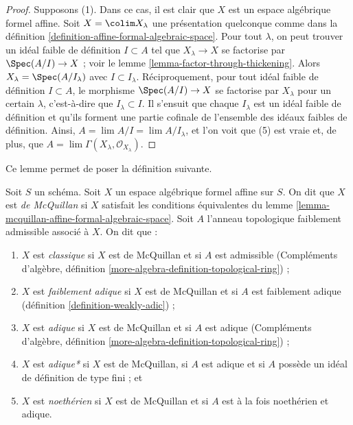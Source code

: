 \begin{proof}
\medskip\noindent
Supposons (1). Dans ce cas, il est clair que $X$ est un espace algébrique
formel affine. Soit $X = \colim X_\lambda$ une présentation quelconque comme dans
la définition \ref{definition-affine-formal-algebraic-space}.
Pour tout $\lambda$, on peut trouver un idéal faible de définition
$I \subset A$ tel que $X_\lambda \to X$ se factorise par
$\Spec(A/I) \to X$ ; voir le lemme \ref{lemma-factor-through-thickening}.
Alors $X_\lambda = \Spec(A/I_\lambda)$ avec $I \subset I_\lambda$.
Réciproquement, pour tout idéal faible de définition $I \subset A$,
le morphisme $\Spec(A/I) \to X$ se factorise par $X_\lambda$
pour un certain $\lambda$, c'est-à-dire que $I_\lambda \subset I$.
Il s'ensuit que chaque $I_\lambda$ est un idéal faible de définition
et qu'ils forment une partie cofinale de l'ensemble des idéaux faibles
de définition. Ainsi, $A = \lim A/I = \lim A/I_\lambda$,
et l'on voit que (5) est vraie et, de plus, que
$A = \lim \Gamma(X_\lambda, \mathcal{O}_{X_\lambda})$.
\end{proof}

\noindent
Ce lemme permet de poser la définition suivante.

\begin{definition}
\label{definition-types-affine-formal-algebraic-space}
Soit $S$ un schéma. Soit $X$ un espace algébrique formel affine sur $S$.
On dit que $X$ est {\it de McQuillan} si $X$ satisfait les conditions équivalentes
du lemme \ref{lemma-mcquillan-affine-formal-algebraic-space}. Soit $A$
l'anneau topologique faiblement admissible associé à $X$. On dit que :
\begin{enumerate}
\item $X$ est {\it classique} si $X$ est de McQuillan et si $A$ est admissible
(Compléments d'algèbre, définition \ref{more-algebra-definition-topological-ring}) ;
\item $X$ est {\it faiblement adique} si $X$ est de McQuillan et si $A$ est faiblement adique
(définition \ref{definition-weakly-adic}) ;
\item $X$ est {\it adique} si $X$ est de McQuillan et si $A$ est adique
(Compléments d'algèbre, définition \ref{more-algebra-definition-topological-ring}) ;
\item $X$ est {\it adique*} si $X$ est de McQuillan, si $A$ est adique et si $A$
possède un idéal de définition de type fini ; et
\item $X$ est {\it noethérien} si $X$ est de McQuillan et si $A$ est
à la fois noethérien et adique.
\end{enumerate}
\end{definition}

